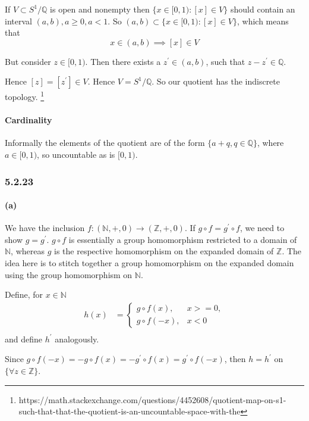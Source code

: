 \documentclass{article}
\begin{document}
If $V \subset S^1/\mathds{Q}$ is open and nonempty then $\{ x \in [0,1): [x] \in V  \}$ should contain an interval $(a,b), a \ge 0, a < 1$. So $(a,b) \subset \{ x \in [0,1): [x] \in V  \}$, which means that
\begin{equation*}
  x \in (a,b) \implies [x] \in V
\end{equation*}

But consider $z \in [0,1)$. Then there exists a $z^\prime \in (a,b)$, such that $z - z^\prime \in \mathds{Q}$.

Hence $[z] = [z^\prime] \in V$. Hence $V = S^1/\mathds{Q}$. So our quotient has the indiscrete topology.  \footnote{https://math.stackexchange.com/questions/4452608/quotient-map-on-s1-such-that-that-the-quotient-is-an-uncountable-space-with-the}
\paragraph{Cardinality}  Informally the elements of the quotient are of the form $\{ a + q, q \in \mathds{Q} \}$, where $a \in [0,1)$, so uncountable as is $[0,1)$.

\subsubsection*{5.2.23}
\paragraph{(a)}

We have the inclusion $f: (\mathds{N},+,0) \rightarrow (\mathds{Z},+,0)$. If $g\circ f = g^\prime\circ f$, we need to show $g=g^\prime$. $g\circ f$ is essentially a group homomorphism restricted to a domain of $\mathds{N}$, whereas $g$ is the respective homomorphism on the expanded domain of $\mathds{Z}$. The idea here is to stitch together a group homomorphism on the expanded domain using the group homomorphism on $\mathds{N}$.

Define, for $x \in \mathds{N}$
\begin{align*}
  h(x) &= \begin{cases}
    g \circ f(x), &  x >=0,  \\
    g \circ f(-x), &  x < 0
  \end{cases} \\
\end{align*} and define $h^\prime$ analogously.

Since $g \circ f(-x) = -g \circ f (x) = -g^\prime \circ f (x) = g^\prime \circ f (-x)$, then $h=h^\prime$ on $\{\forall z \in \mathds{Z}\}$.
\end{document}
